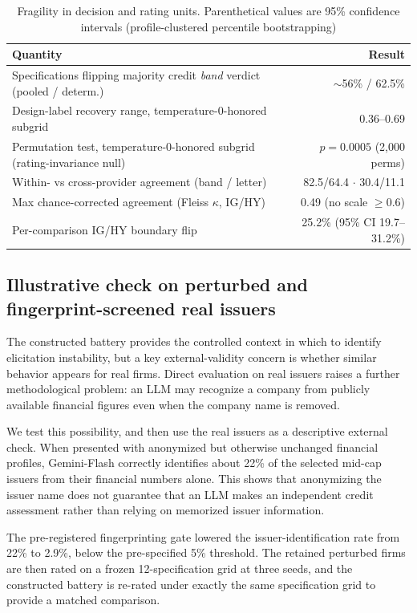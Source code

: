 \documentclass[a4paper,fleqn]{cas-sc}
\begin{document}
\begin{table}[t]\centering
\caption{Fragility in decision and rating units. Parenthetical values are 95\% confidence intervals
(profile-clustered percentile bootstrapping)}\label{tab:frag}
\begin{tabular}{lr}\toprule
Quantity & Result \\\midrule
Specifications flipping majority credit \emph{band} verdict (pooled / determ.) & $\sim$56\% / 62.5\% \\
Design-label recovery range, temperature-0-honored subgrid & 0.36--0.69 \\
Permutation test, temperature-0-honored subgrid (rating-invariance null) & $p=0.0005$ (2{,}000 perms) \\
Within- vs cross-provider agreement (band / letter) & 82.5/64.4 $\cdot$ 30.4/11.1 \\
Max chance-corrected agreement (Fleiss $\kappa$, IG/HY) & 0.49 (no scale $\geq0.6$) \\
Per-comparison IG/HY boundary flip & 25.2\% (95\% CI 19.7--31.2\%) \\\bottomrule
\end{tabular}\end{table}

\subsection{Illustrative check on perturbed and fingerprint-screened real issuers}\label{sec:realarm}
The constructed battery provides the controlled context in which to identify elicitation instability, but
a key external-validity concern is whether similar behavior appears for real firms. Direct evaluation on
real issuers raises a further methodological problem: an LLM may recognize a company from publicly
available financial figures even when the company name is removed.

We test this possibility, and then use the real issuers as a descriptive external check. When presented with
anonymized but otherwise unchanged financial profiles, Gemini-Flash correctly identifies about 22\% of
the selected mid-cap issuers from their financial numbers alone. This shows that anonymizing the issuer
name does not guarantee that an LLM makes an independent credit assessment rather than relying on
memorized issuer information.

The pre-registered fingerprinting gate lowered the issuer-identification rate from 22\% to 2.9\%, below
the pre-specified 5\% threshold. The retained perturbed firms are then rated on a frozen 12-specification grid
at three seeds, and the constructed battery is re-rated under exactly the same specification grid to
provide a matched comparison.
\end{document}
